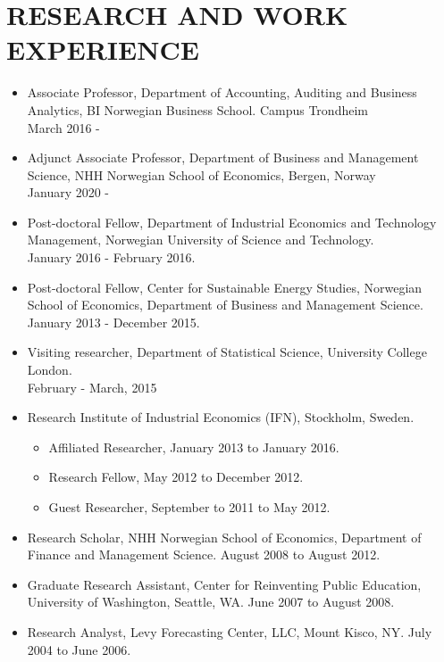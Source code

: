 \documentclass[margin]{res}
\begin{document}
\section{RESEARCH AND WORK EXPERIENCE}
                  \begin{itemize}
                  \setlength{\itemsep}{10pt}
                  \item[] Associate Professor, Department of Accounting, Auditing and Business Analytics, BI Norwegian Business School. Campus Trondheim \\ March 2016 -
                  \item[] Adjunct Associate Professor, Department of Business and Management Science, NHH Norwegian School of Economics, Bergen, Norway \\ January 2020 -
                  \item[] Post-doctoral Fellow, Department of Industrial Economics and Technology Management, Norwegian University of Science and Technology. \\ January 2016 - February 2016.
                  \item[] Post-doctoral Fellow, Center for Sustainable Energy Studies, Norwegian School of Economics, Department of Business and Management Science. \\ January 2013 - December 2015.

                  \item[] Visiting researcher, Department of Statistical Science, University College London. \\ February - March, 2015

                  \item[] Research Institute of Industrial Economics (IFN), Stockholm, Sweden.
                    \begin{itemize}
                    \item[] Affiliated Researcher, January 2013 to January 2016.
                    \item[] Research Fellow, May 2012 to December 2012.
                    \item[] Guest Researcher, September to 2011 to May 2012.
                    \end{itemize}
                  \item[] Research Scholar, NHH Norwegian School of Economics, Department of Finance and Management Science. August 2008 to August 2012.

                  \item[] Graduate Research Assistant, Center for Reinventing Public Education, University of Washington, Seattle, WA. June 2007 to August 2008.

                  \item[] Research Analyst, Levy Forecasting Center, LLC, Mount Kisco, NY. July 2004 to June 2006.

                  \end{itemize}
\end{document}
